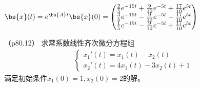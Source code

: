 \documentclass[12pt, a4paper, oneside, UTF8]{ctexbook}
\begin{document}
\begin{solution}
    $\bs{x}(t)=e^{\bs{A}t}\bs{x}(0)=\begin{pmatrix}
        \frac{2}{5}e^{-15t}+\frac{9}{10}e^{-5t}+\frac{17}{10}e^{5t}\\
        \frac{3}{5}e^{-15t}-\frac{9}{10}e^{-5t}-\frac{17}{10}e^{5t}\\
        \frac{1}{5}e^{-15t}-\frac{9}{10}e^{-5t}+\frac{17}{10}e^{5t}

    \end{pmatrix}$

\end{solution}

\begin{question}（p80.12）
    求常系数线性齐次微分方程组
    \begin{align*}
        \left\{
        \begin{array}{ll}
            x_1'(t)=x_1(t)-x_2(t)\\
            x_2'(t)=4x_1(t)-3x_2(t)+1
        \end{array}
        \right.
    \end{align*}
    满足初始条件$x_1(0)=1,x_2(0)=2$的解。
\end{question}
\end{document}
